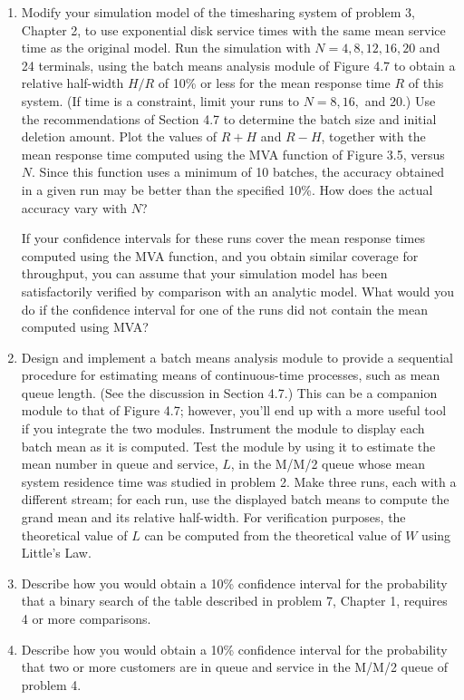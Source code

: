\begin{enumerate}
  For comparison with your estimated means, the theoretical mean residence
  time in the M/M/2 queue is $T_s/(1-\rho^2)$, where $\rho = T_s/(2T_a)$.

\item Modify your simulation model of the timesharing system of problem 3,
  Chapter 2, to use exponential disk service times with the same mean service
  time as the original model. Run the simulation with $N = 4, 8, 12, 16, 20$ and
  24 terminals, using the batch means analysis module of Figure 4.7 to obtain a
  relative half-width $H/R$ of 10\% or less for the mean response time $R$ of
  this system. (If time is a constraint, limit your runs to $N = 8, 16,$ and
  20.) Use the recommendations of Section 4.7 to determine the batch size and
  initial deletion amount. Plot the values of $R+H$ and $R-H$, together with the
  mean response time computed using the MVA function of Figure 3.5, versus $N$.
  Since this function uses a minimum of 10 batches, the accuracy obtained in a
  given run may be better than the specified 10\%. How does the actual accuracy
  vary with $N$?

  If your confidence intervals for these runs cover the mean response times
  computed using the MVA function, and you obtain similar coverage for
  throughput, you can assume that your simulation model has been satisfactorily
  verified by comparison with an analytic model. What would you do if the
  confidence interval for one of the runs did not contain the mean computed
  using MVA?

\item Design and implement a batch means analysis module to provide a
  sequential procedure for estimating means of continuous-time processes, such
  as mean queue length. (See the discussion in Section 4.7.) This can be a
  companion module to that of Figure 4.7; however, you'll end up with a more
  useful tool if you integrate the two modules. Instrument the module to
  display each batch mean as it is computed. Test the module by using it to
  estimate the mean number in queue and service, $L$, in the M/M/2 queue whose
  mean system residence time was studied in problem 2. Make three runs, each
  with a different stream; for each run, use the displayed batch means to
  compute the grand mean and its relative half-width. For verification
  purposes, the theoretical value of $L$ can be computed from the theoretical
  value of $W$ using Little's Law.

\item Describe how you would obtain a 10\% confidence interval for the
  probability that a binary search of the table described in problem 7,
  Chapter 1, requires 4 or more comparisons.

\item Describe how you would obtain a 10\% confidence interval for the
  probability that two or more customers are in queue and service in the M/M/2
  queue of problem 4.
\end{enumerate}

